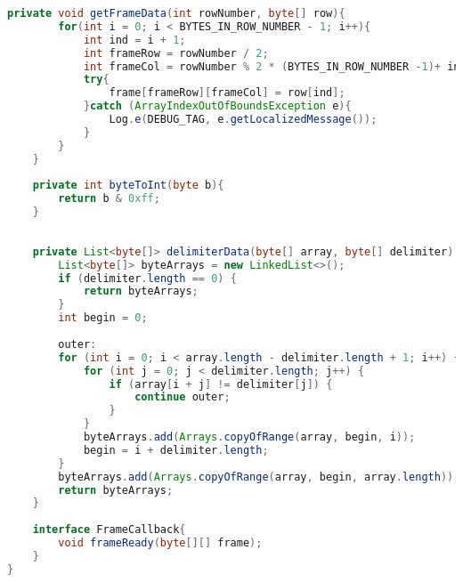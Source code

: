 \documentclass[hidelinks,11pt,a4paper,oneside,article]{memoir}
\begin{document}
\begin{lstlisting}[label={listing:highcamera},caption={HighCamera class, represents a frame},language=Java, style=styleprogrammingappendix]
    private void getFrameData(int rowNumber, byte[] row){
        for(int i = 0; i < BYTES_IN_ROW_NUMBER - 1; i++){
            int ind = i + 1;
            int frameRow = rowNumber / 2;
            int frameCol = rowNumber % 2 * (BYTES_IN_ROW_NUMBER -1)+ ind;
            try{
                frame[frameRow][frameCol] = row[ind];
            }catch (ArrayIndexOutOfBoundsException e){
                Log.e(DEBUG_TAG, e.getLocalizedMessage());
            }
        }
    }
    
    private int byteToInt(byte b){
        return b & 0xff;
    }
    
    
    private List<byte[]> delimiterData(byte[] array, byte[] delimiter) {
        List<byte[]> byteArrays = new LinkedList<>();
        if (delimiter.length == 0) {
            return byteArrays;
        }
        int begin = 0;
        
        outer:
        for (int i = 0; i < array.length - delimiter.length + 1; i++) {
            for (int j = 0; j < delimiter.length; j++) {
                if (array[i + j] != delimiter[j]) {
                    continue outer;
                }
            }
            byteArrays.add(Arrays.copyOfRange(array, begin, i));
            begin = i + delimiter.length;
        }
        byteArrays.add(Arrays.copyOfRange(array, begin, array.length));
        return byteArrays;
    }
    
    interface FrameCallback{
        void frameReady(byte[][] frame);
    }
}
\end{lstlisting}\vspace{14pt}
\end{document}
